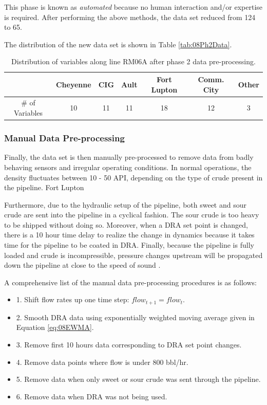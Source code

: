 This phase is known as \textit{automated} because no human interaction and/or expertise is required. After performing the above methods, the data set reduced from 124 to 65.  

The distribution of the new data set is shown in Table \ref{tab:08Ph2Data}.

\begin{table}[h]
    \centering
    {
    \begin{tabular}{ c | c | c | c | c | c | c}
             &  Cheyenne & CIG & Ault & Fort Lupton & Comm. City & Other      \\
        \hline
        \# of Variables  &  10  &  11  &  11  &  18  &  12  &  3  \\
    \end{tabular}}
    \caption{Distribution of variables along line RM06A after phase 2 data pre-processing.}
    \label{tab:08Ph1Data}
\end{table}

\subsubsection{Manual Data Pre-processing}
Finally, the data set is then manually pre-processed to remove data from badly behaving sensors and irregular operating conditions. In normal operations, the density fluctuates between 10 - 50 API, depending on the type of crude present in the pipeline.  Fort Lupton 

Furthermore, due to the hydraulic setup of the pipeline, both sweet and sour crude are sent into the pipeline in a cyclical fashion. The sour crude is too heavy to be shipped without doing so.  Moreover, when a DRA set point is changed, there is a 10 hour time delay to realize the change in dynamics because it takes time for the pipeline to be coated in DRA.  Finally, because the pipeline is fully loaded and crude is incompressible, pressure changes upstream will be propagated down the pipeline at close to the speed of sound \cite{fluid_mechanics}.  

A comprehensive list of the manual data pre-processing procedures is as follows:
\begin{itemize}
    \item 1. Shift flow rates up one time step: $flow_{t + 1} = flow_t$.
    \item 2. Smooth DRA data using exponentially weighted moving average given in Equation \ref{eq:08EWMA}.  
    \item 3. Remove first 10 hours data corresponding to DRA set point changes.
    \item 4. Remove data points where flow is under 800 bbl/hr.
    \item 5. Remove data when only sweet or sour crude was sent through the pipeline.
    \item 6. Remove data when DRA was not being used.
\end{itemize}


